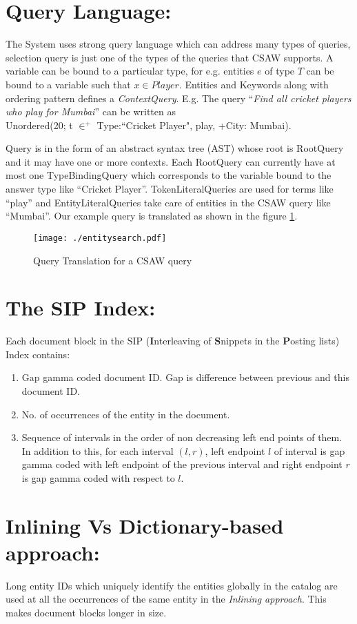 \documentclass[11pt]{report}
\begin{document}
\section{Query Language:}
The System uses strong query language which can address many types of queries, selection query is just one of the types of the queries that
CSAW supports. A variable can be bound to a particular type, for e.g. entities $e$ of type $T$ can be bound to a variable such that
$x \in Player$. Entities and Keywords along with ordering pattern defines a \textit{ContextQuery}. E.g. The query ``\textit{Find all cricket players
who play for Mumbai}'' can be written as \\ Unordered(20; t $\in^+$ Type:``Cricket Player", play, +City: Mumbai).

Query is in the form of an abstract syntax tree (AST) whose root is RootQuery and it may have one or more contexts. Each RootQuery can currently have
at most one TypeBindingQuery which corresponds to the variable bound to the answer type like ``Cricket Player''. TokenLiteralQueries are used for terms like ``play'' and 
EntityLiteralQueries take care of entities in the CSAW query like ``Mumbai''. Our example query is translated as shown in the figure \ref{fig:qtrans}.
\begin{figure}[!htb]
\centering
\texttt{[image: ./entitysearch.pdf]}
\caption{ Query Translation for a CSAW \cite{csaw} query }
\label{fig:qtrans}
\end{figure}

\section{The SIP Index:}
Each document block in the SIP (\textbf{I}nterleaving of \textbf{S}nippets in the \textbf{P}osting lists) Index contains:
\begin{enumerate}
 \item Gap gamma coded document ID. Gap is difference between previous and this document ID.
 \item No. of occurrences of the entity in the document.
 \item Sequence of intervals in the order of non decreasing left end points of them. In addition to this, for each interval $(l,r)$, left endpoint $l$ of interval is
gap gamma coded with left endpoint of the previous interval and right endpoint $r$ is gap gamma coded with respect to $l$.
\end{enumerate}

\section{Inlining Vs Dictionary-based approach:}
Long entity IDs which uniquely identify the entities globally in the catalog are used at all the occurrences of the same entity 
in the \textit{Inlining approach}. This makes document blocks longer in size.
\end{document}
